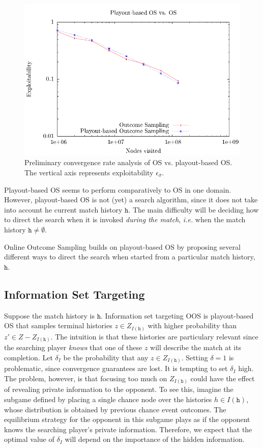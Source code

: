 \documentclass[letterpaper]{article}
\newcommand{\tth}{\mathtt{h}}
\newcommand{\ie}{{\it i.e.}\xspace}
\begin{document}
\begin{figure}
\hspace{-0.2cm}\includegraphics[scale=0.7]{figs/first-pbos/os-vs-pbos}
\caption{Preliminary convergence rate analysis of OS vs. playout-based OS. The vertical axis represents exploitability $\epsilon_{\bar{\sigma}}$.
\label{fig:os-vs-pbos}} 
\end{figure}

Playout-based OS seems to perform comparatively to OS in one domain. However, playout-based OS is not (yet) a search algorithm, 
since it does not take into account he current match history $\tth$. 
The main difficulty will be deciding how to direct the search when it is invoked {\it during the match}, \ie when the match 
history $\tth \not= \emptyset$. 

Online Outcome Sampling builds on playout-based OS by proposing several different ways to direct the search when started from a particular
match history, $\tth$. 

\subsection{Information Set Targeting}

Suppose the match history is $\tth$. Information set targeting OOS is playout-based OS that samples terminal histories $z \in Z_{I(\tth)}$ 
with higher probability than $z' \in Z - Z_{I(\tth)}$. The intuition is that these histories are particulary relevant since the searching player 
{\it knows} that one of these $z$ will describe the match at its completion. Let $\delta_I$ be the probability that any $z \in Z_{I(\tth)}$. 
Setting $\delta = 1$ is problematic, since convergence guarantees are lost. It is tempting to set $\delta_I$ high. 
The problem, however, is that 
focusing too much on $Z_{I(\tth)}$ could have the effect of revealing private information to the opponent. To see this, imagine the subgame 
defined by placing a single chance node over the histories $h \in I(\tth)$, whose distribution is obtained by previous chance event outcomes. 
The equilibrium strategy for the opponent in this subgame plays as if the opponent knows the searching player's private information. Therefore,
we expect that the optimal value of $\delta_I$ will depend on the importance of the hidden information.
\end{document}
